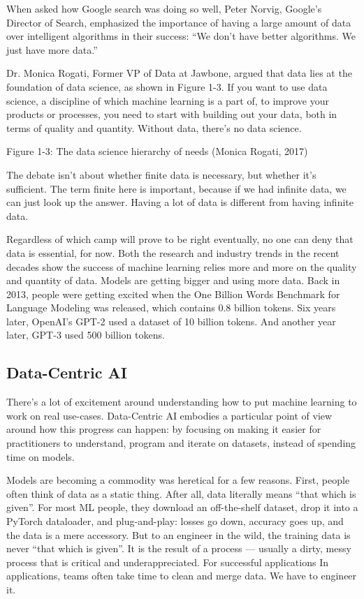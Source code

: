 \documentclass[openany]{book}
\begin{document}
When asked how Google search was doing so well, Peter Norvig, Google’s Director of Search, emphasized the importance of having a large amount of data over intelligent algorithms in their success: “We don’t have better algorithms. We just have more data.”

Dr. Monica Rogati, Former VP of Data at Jawbone, argued that data lies at the foundation of data science, as shown in Figure 1-3. If you want to use data science, a discipline of which machine learning is a part of, to improve your products or processes, you need to start with building out your data, both in terms of quality and quantity. Without data, there’s no data science.


Figure 1-3: The data science hierarchy of needs (Monica Rogati, 2017)

The debate isn’t about whether finite data is necessary, but whether it’s sufficient. The term finite here is important, because if we had infinite data, we can just look up the answer. Having a lot of data is different from having infinite data.

Regardless of which camp will prove to be right eventually, no one can deny that data is essential, for now. Both the research and industry trends in the recent decades show the success of machine learning relies more and more on the quality and quantity of data. Models are getting bigger and using more data. Back in 2013, people were getting excited when the One Billion Words Benchmark for Language Modeling was released, which contains 0.8 billion tokens. Six years later, OpenAI’s GPT-2 used a dataset of 10 billion tokens. And another year later, GPT-3 used 500 billion tokens.












\subsection{Data-Centric AI}

There's a lot of excitement around understanding how to put machine learning to work on real use-cases. Data-Centric AI embodies a particular point of view around how this progress can happen: by focusing on making it easier for practitioners to understand, program and iterate on datasets, instead of spending time on models.

Models are becoming a commodity was heretical for a few reasons. First, people often think of data as a static thing. After all, data literally means “that which is given”. For most ML people, they download an off-the-shelf dataset, drop it into a PyTorch dataloader, and plug-and-play: losses go down, accuracy goes up, and the data is a mere accessory. But to an engineer in the wild, the training data is never “that which is given”. It is the result of a process — usually a dirty, messy process that is critical and underappreciated. For successful applications In applications, teams often take time to clean and merge data. We have to engineer it. 
\end{document}
